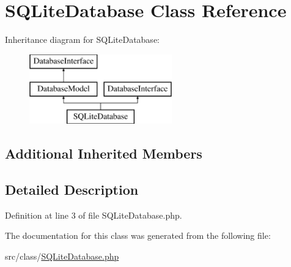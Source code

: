 \hypertarget{class_s_q_lite_database}{}\section{S\+Q\+Lite\+Database Class Reference}
\label{class_s_q_lite_database}
Inheritance diagram for S\+Q\+Lite\+Database\+:\begin{figure}[H]
\begin{center}
\leavevmode
\includegraphics[height=3.000000cm]{class_s_q_lite_database}
\end{center}
\end{figure}
\subsection*{Additional Inherited Members}


\subsection{Detailed Description}


Definition at line 3 of file S\+Q\+Lite\+Database.\+php.



The documentation for this class was generated from the following file\+:\begin{DoxyCompactItemize}
\item 
src/class/\hyperlink{_s_q_lite_database_8php}{S\+Q\+Lite\+Database.\+php}\end{DoxyCompactItemize}
